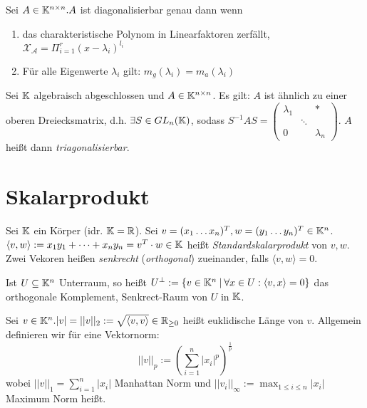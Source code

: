\begin{satz}
	Sei $A \in \mathbb{K}^{n \times n}. A$ ist diagonalisierbar genau dann wenn 
	\begin{enumerate}[noitemsep]
		\item das charakteristische Polynom in Linearfaktoren zerfällt, $\mathcal{X_A}= \Pi_{i=1}^r (x - \lambda_i)^{l_i}$
		\item Für alle Eigenwerte $\lambda_i$ gilt: $m_g(\lambda_i) = m_a(\lambda_i)$
	\end{enumerate}	
\end{satz}

\begin{satz}
	Sei $\mathbb{K}$ algebraisch abgeschlossen und $A \in \mathbb{K}^{n \times n}$. Es gilt: $A$ ist ähnlich zu einer oberen Dreiecksmatrix, d.h. $\exists S \in GL_n(\mathbb{K})$, sodass $S^{-1} A S = \left( \begin{smallmatrix} 
	\lambda_1 & & * \\
	& \ddots & \\
	0 & & \lambda_n
	\end{smallmatrix} \right)$. $A$ heißt dann \emph{triagonalisierbar}.
\end{satz}

\section{Skalarprodukt}
	\begin{definition}[Standardskalarprodukt]
		Sei $\mathbb{K}$ ein Körper (idr. $\mathbb{K} = \mathbb{R}$). Sei $v = (x_1 \dots x_n)^T, w = (y_1 \dots y_n)^T \in \mathbb{K}^n$. $\langle v, w \rangle := x_1y_1 + \dots + x_ny_n = v^T \cdot w \in \mathbb{K}$ heißt \emph{Standardskalarprodukt} von $v,w$.	Zwei Vekoren heißen \emph{senkrecht} (\emph{orthogonal}) zueinander, falls $\langle v, w \rangle = 0$. 
		
		Ist $U \subseteq \mathbb{K}^n$ Unterraum, so heißt $U^{\perp} := \{ v \in \mathbb{K}^n \medspace | \medspace \forall x \in U : \langle v, x \rangle = 0 \}$ das orthogonale Komplement, Senkrect-Raum von $U$ in $\mathbb{K}$.
	\end{definition}

\begin{definition}[Vektornorm]
	Sei $v \in \mathbb{K}^n. |v| = ||v||_2 := \sqrt{\langle v, v \rangle} \in \mathbb{R}_{\geq 0}$ heißt euklidische Länge von $v$. Allgemein definieren wir für eine Vektornorm:
	\begin{equation*}
		||v||_p := (\sum_{i=1}^{n} |x_i|^p)^{\frac{1}{p}}
	\end{equation*}
	wobei $||v||_1 = \sum_{i=1}^{n}|x_i|$ Manhattan Norm und $||v_i||_\infty := \max_{1 \leq i \leq n} |x_i|$ Maximum Norm heißt.
\end{definition}

